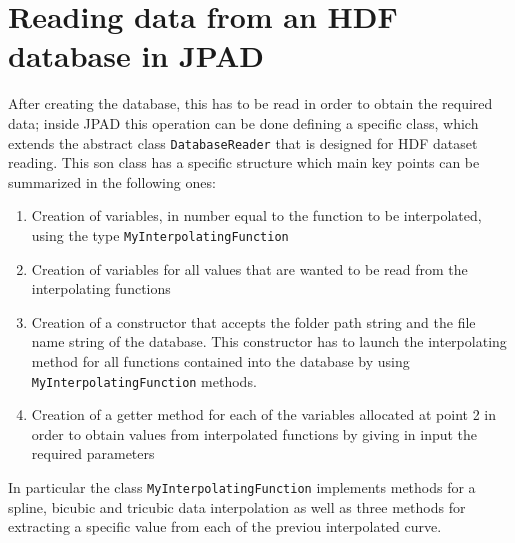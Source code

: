 \section{Reading data from an HDF database in JPAD}\label{par:Appendix2}
After creating the database, this has to be read in order to obtain the required data; inside JPAD this operation can be done defining a specific class, which extends the abstract class \lstinline[language=Java]!DatabaseReader! that is designed for HDF dataset reading. 
%
This son class has a specific structure which main key points can be summarized in the following ones:
%
\begin{enumerate}
\item Creation of variables, in number equal to the function to be interpolated, using the type \lstinline[language=Java]!MyInterpolatingFunction! 
\item Creation of variables for all values that are wanted to be read from the interpolating functions
\item Creation of a constructor that accepts the folder path string and the file name string of the database. This constructor has to launch the interpolating method for all functions contained into the database by using  \lstinline[language=Java]!MyInterpolatingFunction! methods.
\item Creation of a getter method for each of the variables allocated at point 2 in order to obtain values from interpolated functions by giving in input the required parameters
\end{enumerate}
%
\noindent
In particular the class \lstinline[language=Java]!MyInterpolatingFunction! implements methods for a spline, bicubic and tricubic data interpolation as well as three methods for extracting a specific value from each of the previou interpolated curve.

